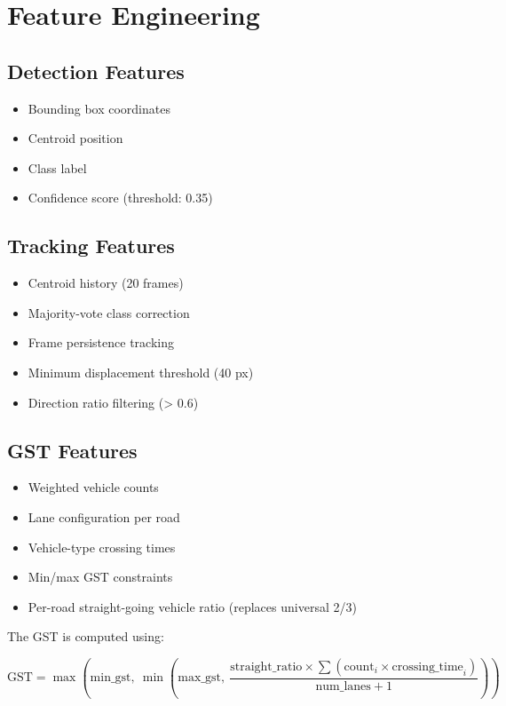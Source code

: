 \section{Feature Engineering}

\subsection{Detection Features}
\begin{itemize}
    \item Bounding box coordinates
    \item Centroid position
    \item Class label
    \item Confidence score (threshold: 0.35)
\end{itemize}

\subsection{Tracking Features}
\begin{itemize}
    \item Centroid history (20 frames)
    \item Majority-vote class correction
    \item Frame persistence tracking
    \item Minimum displacement threshold (40 px)
    \item Direction ratio filtering (> 0.6)
\end{itemize}

\subsection{GST Features}
\begin{itemize}
    \item Weighted vehicle counts
    \item Lane configuration per road
    \item Vehicle-type crossing times
    \item Min/max GST constraints
    \item Per-road straight-going vehicle ratio (replaces universal 2/3)
\end{itemize}

The GST is computed using:

\[
\text{GST} = \max\left(\text{min\_gst},\ \min\left(\text{max\_gst},\ \frac{\text{straight\_ratio} \times \sum (\text{count}_i \times \text{crossing\_time}_i)}{\text{num\_lanes} + 1}\right)\right)
\]

